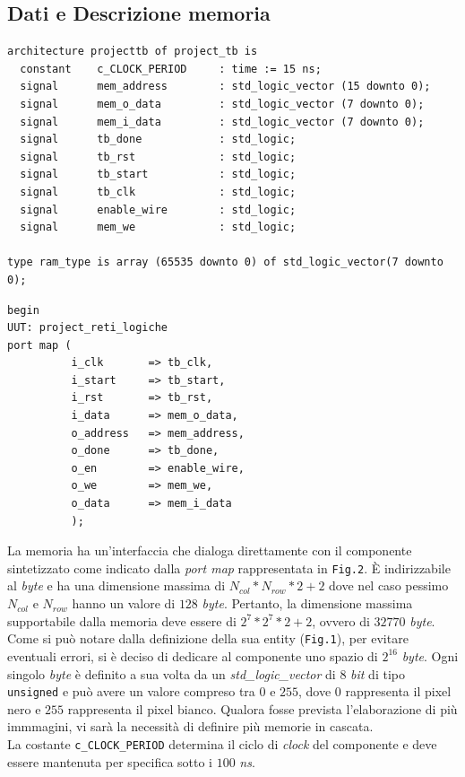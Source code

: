 \documentclass[11pt, a4paper]{article}
\begin{document}
\subsection{Dati e Descrizione memoria}
\begin{lstlisting}[title={Fig.1}]
architecture projecttb of project_tb is
  constant    c_CLOCK_PERIOD     : time := 15 ns;
  signal      mem_address        : std_logic_vector (15 downto 0);
  signal      mem_o_data         : std_logic_vector (7 downto 0);
  signal      mem_i_data         : std_logic_vector (7 downto 0);
  signal      tb_done            : std_logic;
  signal      tb_rst             : std_logic;
  signal      tb_start           : std_logic;
  signal      tb_clk             : std_logic;
  signal      enable_wire        : std_logic;
  signal      mem_we             : std_logic;

type ram_type is array (65535 downto 0) of std_logic_vector(7 downto 0);
\end{lstlisting}
\begin{lstlisting}[title={Fig. 2}]
begin
UUT: project_reti_logiche
port map (
          i_clk       => tb_clk,
          i_start     => tb_start,
          i_rst       => tb_rst,
          i_data      => mem_o_data,
          o_address   => mem_address,
          o_done      => tb_done,
          o_en        => enable_wire,
          o_we        => mem_we,
          o_data      => mem_i_data
          );
\end{lstlisting}
La memoria ha un'interfaccia che dialoga direttamente con il componente sintetizzato come indicato dalla \textit{port map} rappresentata in \texttt{Fig.2}. È indirizzabile al \textit{byte} e ha una dimensione massima di $N_{col}*N_{row}*2+2$ dove nel caso pessimo $N_{col}$ e $N_{row}$ hanno un valore di $128$ \textit{byte}. Pertanto, la dimensione massima supportabile dalla memoria deve essere di $2^7 * 2^7 *2 + 2$, ovvero di $32770$ \textit{byte}. Come si può notare dalla definizione della sua entity (\texttt{Fig.1}), per evitare eventuali errori, si è deciso di dedicare al componente uno spazio di $2^{16}$ \textit{byte}. Ogni singolo \textit{byte} è definito a sua volta da un \textit{std\_logic\_vector} di $8$ \textit{bit} di tipo \texttt{unsigned} e può avere un valore compreso tra $0$ e $255$, dove $0$ rappresenta il pixel nero e $255$ rappresenta il pixel bianco.
Qualora fosse prevista l'elaborazione di più immmagini, vi sarà la necessità di definire più memorie in cascata. \\
La costante \texttt{c\_CLOCK\_PERIOD} determina il ciclo di \textit{clock} del componente e deve essere mantenuta per specifica sotto i $100$ \textit{ns}.
\pagebreak
\end{document}
